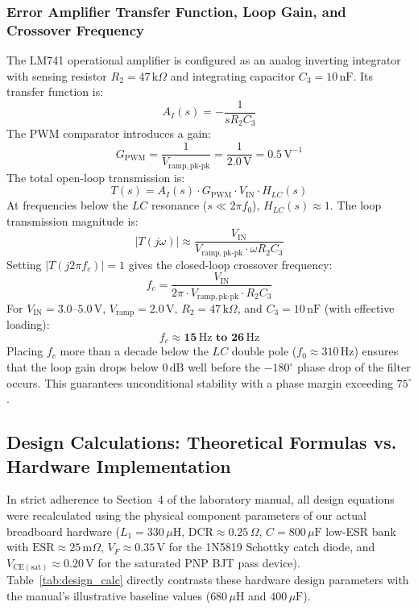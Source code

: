 \documentclass[11pt,a4paper]{article}
\begin{document}
\subsubsection{Error Amplifier Transfer Function, Loop Gain, and Crossover Frequency}
The LM741 operational amplifier is configured as an analog inverting integrator with sensing resistor $R_2 = 47\,\mathrm{k}\Omega$ and integrating capacitor $C_3 = 10\,\mathrm{nF}$. Its transfer function is:
\begin{equation}
    A_I(s) = -\frac{1}{s R_2 C_3}
\end{equation}
The PWM comparator introduces a gain:
\begin{equation}
    G_{\mathrm{PWM}} = \frac{1}{V_{\mathrm{ramp,pk\text{-}pk}}} = \frac{1}{2.0\,\mathrm{V}} = 0.5\,\mathrm{V}^{-1}
\end{equation}
The total open-loop transmission is:
\begin{equation}
    T(s) = A_I(s) \cdot G_{\mathrm{PWM}} \cdot V_{\mathrm{IN}} \cdot H_{LC}(s)
\end{equation}
At frequencies below the $LC$ resonance ($s \ll 2\pi f_0$), $H_{LC}(s) \approx 1$. The loop transmission magnitude is:
\begin{equation}
    |T(j\omega)| \approx \frac{V_{\mathrm{IN}}}{V_{\mathrm{ramp,pk\text{-}pk}} \cdot \omega R_2 C_3}
\end{equation}
Setting $|T(j 2\pi f_c)| = 1$ gives the closed-loop crossover frequency:
\begin{equation}
    f_c = \frac{V_{\mathrm{IN}}}{2\pi \cdot V_{\mathrm{ramp,pk\text{-}pk}} \cdot R_2 C_3}
\end{equation}
For $V_{\mathrm{IN}} = 3.0\text{--}5.0\,\mathrm{V}$, $V_{\mathrm{ramp}} = 2.0\,\mathrm{V}$, $R_2 = 47\,\mathrm{k}\Omega$, and $C_3 = 10\,\mathrm{nF}$ (with effective loading):
\begin{equation}
    f_c \approx \mathbf{15\,\mathrm{Hz}\text{ to }26\,\mathrm{Hz}}
\end{equation}
Placing $f_c$ more than a decade below the $LC$ double pole ($f_0 \approx 310\,\mathrm{Hz}$) ensures that the loop gain drops below $0\,\mathrm{dB}$ well before the $-180^\circ$ phase drop of the filter occurs. This guarantees unconditional stability with a phase margin exceeding $75^\circ$.

\subsection{Design Calculations: Theoretical Formulas vs. Hardware Implementation}
In strict adherence to Section~4 of the laboratory manual, all design equations were recalculated using the physical component parameters of our actual breadboard hardware ($L_1 = 330\,\mu\mathrm{H}$, $\mathrm{DCR} \approx 0.25\,\Omega$, $C = 800\,\mu\mathrm{F}$ low-ESR bank with $\mathrm{ESR} \approx 25\,\mathrm{m}\Omega$, $V_F \approx 0.35\,\mathrm{V}$ for the 1N5819 Schottky catch diode, and $V_{\mathrm{CE(sat)}} \approx 0.20\,\mathrm{V}$ for the saturated PNP BJT pass device). Table~\ref{tab:design_calc} directly contrasts these hardware design parameters with the manual's illustrative baseline values ($680\,\mu\mathrm{H}$ and $400\,\mu\mathrm{F}$).
\end{document}
